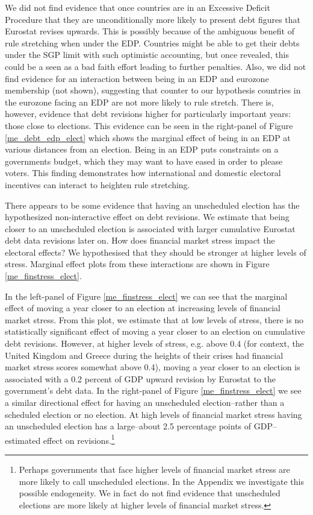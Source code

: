 \documentclass[]{article}
\begin{document}
We did not find evidence that once countries are in an Excessive Deficit Procedure that they are unconditionally more likely to present debt figures that Eurostat revises upwards. This is possibly because of the ambiguous benefit of rule stretching when under the EDP. Countries might be able to get their debts under the SGP limit with such optimistic accounting, but once revealed, this could be a seen as a bad faith effort leading to further penalties. Also, we did not find evidence for an interaction between being in an EDP and eurozone membership (not shown), suggesting that counter to our hypothesis countries in the eurozone facing an EDP are not more likely to rule stretch. There is, however, evidence that debt revisions higher for particularly important years: those close to elections. This evidence can be seen in the right-panel of Figure \ref{me_debt_edp_elect} which shows the marginal effect of being in an EDP at various distances from an election. Being in an EDP puts constraints on a governments budget, which they may want to have eased in order to please voters. This finding demonstrates how international and domestic electoral incentives can interact to heighten rule stretching.

There appears to be some evidence that having an unscheduled election has the hypothesized non-interactive effect on debt revisions. We estimate that being closer to an unscheduled election is associated with larger cumulative Eurostat debt data revisions later on. How does financial market stress impact the electoral effects? We hypothesised that they should be stronger at higher levels of stress. Marginal effect plots from these interactions are shown in Figure \ref{me_finstress_elect}.

In the left-panel of Figure \ref{me_finstress_elect} we can see that the marginal effect of moving a year closer to an election at increasing levels of financial market stress. From this plot, we estimate that at low levels of stress, there is no statistically significant effect of moving a year closer to an election on cumulative debt revisions. However, at higher levels of stress, e.g. above 0.4 (for context, the United Kingdom and Greece during the heights of their crises had financial market stress scores somewhat above 0.4), moving a year closer to an election is associated with a 0.2 percent of GDP upward revision by Eurostat to the government's debt data. In the right-panel of Figure \ref{me_finstress_elect} we see a similar directional effect for having an unscheduled election--rather than a scheduled election or no election. At high levels of financial market stress having an unscheduled election has a large--about 2.5 percentage points of GDP--estimated effect on revisions.\footnote{Perhaps governments that face higher levels of financial market stress are more likely to call unscheduled elections. In the Appendix we investigate this possible endogeneity. We in fact do not find evidence that unscheduled elections are more likely at higher levels of financial market stress.}
\end{document}
